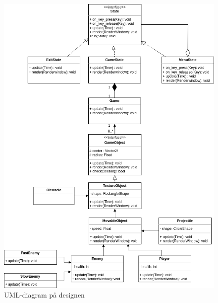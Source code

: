 \documentclass{TDP005mall}
\begin{document}
\begin{figure}[!h]
  \begin{center}
  \includegraphics[width=0.95\linewidth]{uml.png}
  \caption {UML-diagram på designen}
  \label {fig:picture}
  \end{center}
\end {figure}
\end{document}
